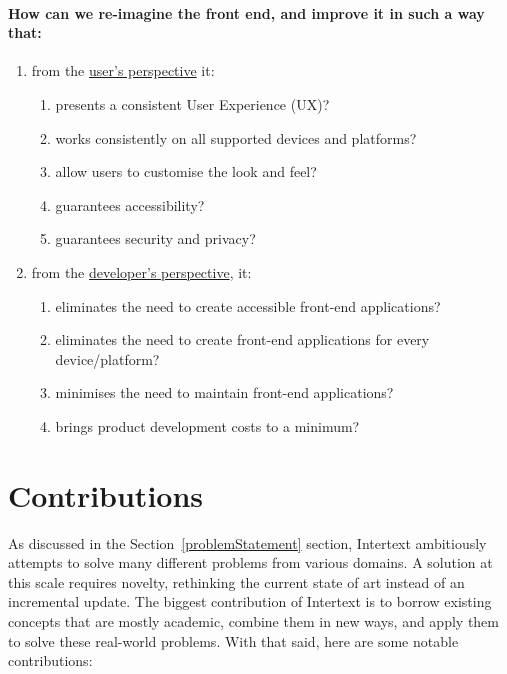 \paragraph{How can we re-imagine the front end, and improve it in such a way that:}
\begin{enumerate}
  \item from the \underline{user's perspective} it:
  \begin{enumerate}
    \item presents a consistent User Experience (UX)?
    \item works consistently on all supported devices and platforms?
    \item allow users to customise the look and feel?
    \item guarantees accessibility?
    \item guarantees security and privacy?
  \end{enumerate}
  \item from the \underline{developer's perspective}, it:
  \begin{enumerate}
    \item eliminates the need to create accessible front-end applications?
    \item eliminates the need to create front-end applications for every device/platform?
    \item minimises the need to maintain front-end applications?
    \item brings product development costs to a minimum?
    
  \end{enumerate}
\end{enumerate}

\section{Contributions} \label{contributions}

As discussed in the Section~\ref{problemStatement} section, Intertext ambitiously attempts to solve many different problems from various domains. A solution at this scale requires novelty, rethinking the current state of art instead of an incremental update. The biggest contribution of Intertext is to borrow existing concepts that are mostly academic, combine them in new ways, and apply them to solve these real-world problems. With that said, here are some notable contributions:

